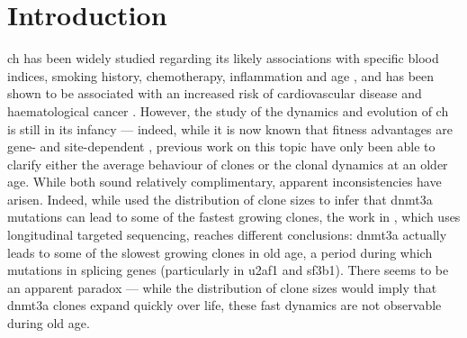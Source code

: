 \section{Introduction}

\ac{ch} has been widely studied regarding its likely associations with specific blood indices, smoking history, chemotherapy, inflammation and age \cite{Dawoud2020-af,Coombs2017-ph,McKerrell2015-rl,Cai2018-yi,Bolton2020-ct}, and has been shown to be associated with an increased risk of cardiovascular disease and haematological cancer \cite{Jaiswal2014-rl,Genovese2014-eu, Young2016-du, Xie2014-np, Desai2018-pj, Midic2020-zh, Zink2017-zi, Acuna-Hidalgo2017-ng}. However, the study of the dynamics and evolution of \ac{ch} is still in its infancy --- indeed, while it is now known that fitness advantages are gene- and site-dependent \cite{Watson2020-pz,Robertson2021-sw}, previous work on this topic have only been able to clarify either the average behaviour of clones or the clonal dynamics at an older age. While both sound relatively complimentary, apparent inconsistencies have arisen. Indeed, while \cite{Watson2020-pz} used the distribution of clone sizes to infer that \ac{dnmt3a} mutations can lead to some of the fastest growing clones, the work in \cite{Robertson2021-sw}, which uses longitudinal targeted sequencing, reaches different conclusions: \ac{dnmt3a} actually leads to some of the slowest growing clones in old age, a period during which mutations in splicing genes (particularly in \ac{u2af1} and \ac{sf3b1}). There seems to be an apparent paradox --- while the distribution of clone sizes would imply that \ac{dnmt3a} clones expand quickly over life, these fast dynamics are not observable during old age. 

